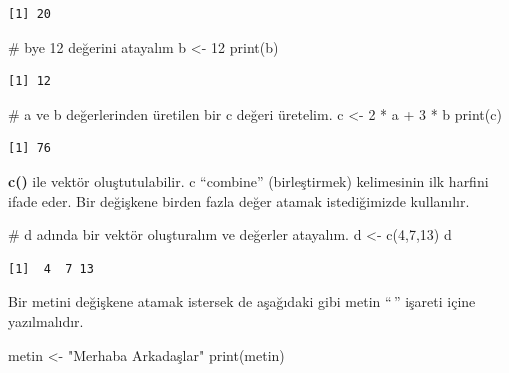 \documentclass[
  letterpaper,
  DIV=11,
  numbers=noendperiod]{scrreprt}
\newenvironment{Shaded}{\begin{snugshade}}{\end{snugshade}}
\newcommand{\CommentTok}[1]{\textcolor[rgb]{0.37,0.37,0.37}{#1}}
\newcommand{\DecValTok}[1]{\textcolor[rgb]{0.68,0.00,0.00}{#1}}
\newcommand{\FunctionTok}[1]{\textcolor[rgb]{0.28,0.35,0.67}{#1}}
\newcommand{\NormalTok}[1]{\textcolor[rgb]{0.00,0.23,0.31}{#1}}
\newcommand{\OtherTok}[1]{\textcolor[rgb]{0.00,0.23,0.31}{#1}}
\newcommand{\SpecialCharTok}[1]{\textcolor[rgb]{0.37,0.37,0.37}{#1}}
\newcommand{\StringTok}[1]{\textcolor[rgb]{0.13,0.47,0.30}{#1}}
\begin{document}
\begin{verbatim}
[1] 20
\end{verbatim}

\begin{Shaded}
\begin{Highlighting}[]
\CommentTok{\# b\textquotesingle{}ye 12 değerini atayalım  }
\NormalTok{b }\OtherTok{\textless{}{-}} \DecValTok{12}  
\FunctionTok{print}\NormalTok{(b)   }
\end{Highlighting}
\end{Shaded}

\begin{verbatim}
[1] 12
\end{verbatim}

\begin{Shaded}
\begin{Highlighting}[]
\CommentTok{\# a ve b değerlerinden üretilen bir c değeri üretelim.   }
\NormalTok{c }\OtherTok{\textless{}{-}} \DecValTok{2} \SpecialCharTok{*}\NormalTok{ a }\SpecialCharTok{+} \DecValTok{3} \SpecialCharTok{*}\NormalTok{ b  }
\FunctionTok{print}\NormalTok{(c) }
\end{Highlighting}
\end{Shaded}

\begin{verbatim}
[1] 76
\end{verbatim}

\textbf{c()} ile vektör oluştutulabilir. c ``combine'' (birleştirmek)
kelimesinin ilk harfini ifade eder. Bir değişkene birden fazla değer
atamak istediğimizde kullanılır.

\begin{Shaded}
\begin{Highlighting}[]
\CommentTok{\# d adında bir vektör oluşturalım ve değerler atayalım.   }
\NormalTok{d }\OtherTok{\textless{}{-}} \FunctionTok{c}\NormalTok{(}\DecValTok{4}\NormalTok{,}\DecValTok{7}\NormalTok{,}\DecValTok{13}\NormalTok{)  }
\NormalTok{d }
\end{Highlighting}
\end{Shaded}

\begin{verbatim}
[1]  4  7 13
\end{verbatim}

Bir metini değişkene atamak istersek de aşağıdaki gibi metin ``\,''
işareti içine yazılmalıdır.

\begin{Shaded}
\begin{Highlighting}[]
\NormalTok{metin }\OtherTok{\textless{}{-}} \StringTok{"Merhaba Arkadaşlar"}  
\FunctionTok{print}\NormalTok{(metin)}
\end{Highlighting}
\end{Shaded}
\end{document}
